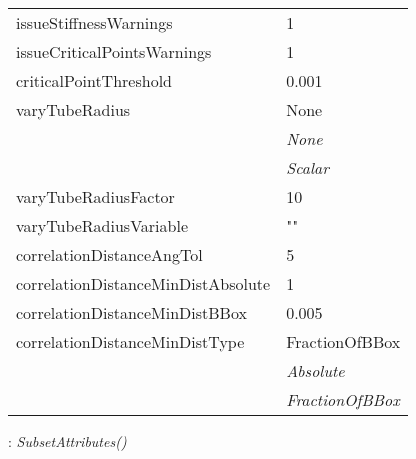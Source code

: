 \documentclass[10pt,a4paper]{report}
\begin{document}
\begin{longtable}{ll}
issueStiffnessWarnings  &  1 \\
issueCriticalPointsWarnings  &  1 \\
criticalPointThreshold  &  0.001 \\
varyTubeRadius  &  None   \\
 & {\it  None} \\
 & {\it  Scalar} \\
varyTubeRadiusFactor  &  10 \\
varyTubeRadiusVariable  &  "" \\
correlationDistanceAngTol  &  5 \\
correlationDistanceMinDistAbsolute  &  1 \\
correlationDistanceMinDistBBox  &  0.005 \\
correlationDistanceMinDistType  &  FractionOfBBox   \\
 & {\it  Absolute} \\
 & {\it  FractionOfBBox} \\
\end{longtable}

\newpage

{}
: {\it SubsetAttributes() }\\[-3mm]
\end{document}
